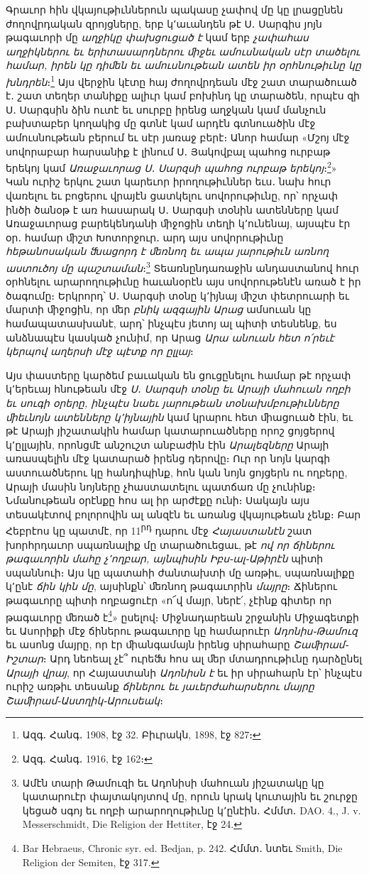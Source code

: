 \documentclass{article}
\begin{document}
{Գրաւոր հին վկայութիւններուն պակասը չափով մը կը լրացընեն ժողովրդական զրոյցները, երբ կ՚աւանդեն թէ Ս․ Սարգիս յոյն թագաւորի մը \emph{աղջիկը փախցուցած է} կամ երբ \emph{չափահաս աղջիկներու եւ երիտասարդներու ﬕջեւ ամուսնական սէր տածելու համար, իրեն կը դիﬔն եւ ամուսնութեան ատեն իր օրհնութիւնը կը խնդրեն}։\footnote{Ազգ․ Հանգ․ 1908, էջ 32. Բիւրակն, 1898, էջ 827։} Այս վերջին կէտը հայ ժողովրդեան մէջ շատ տարածուած է․ շատ տեղեր տանիքը ալիւր կամ բոխինդ կը տարածեն, որպէս զի Ս․ Սարգսին ձին ուտէ եւ սուրբը իրենց աղջկան կամ մանչուն բախտաբեր կողակից մը գտնէ կամ արդէն գտնուածին մէջ ամուսնութեան բերում եւ սէր յառաջ բերէ։ Անոր համար «Մշոյ մէջ սովորաբար հարսանիք է լինում Ս․ Յակովբալ պահոց ուրբաթ երեկոյ կամ \emph{Առաջաւորաց Ս․ Սարզսի պահոց ուրբաթ երեկոյ}։\footnote{Ազգ․ Հանգ․ 1916, էջ 162։}» Կան ուրիշ երկու շատ կարեւոր իրողութիւններ եւս․ նախ հուր վառելու եւ բոցերու վրայէն ցատկելու սովորութիւնը, որ՝ որչափ ինծի ծանօթ է առ հասարակ Ս․ Սարգսի տօնին ատենները կամ Առաջաւորաց բարեկենդանի ﬕջոցին տեղի կ՚ունենայ, այսպէս էր օր․ համար ﬕշտ Խոտորջուր․ արդ այս սովորութիւնը \emph{հեթանոսական ﬓացորդ է ﬔռնող եւ ապա յարութիւն առնող աստուծոյ մը պաշտաման}։\footnote{Ամէն տարի Թամուզի եւ Ադոնիսի մահուան յիշատակը կը կատարուէր փայտակոյտով մը, որուն կրակ կուտային եւ շուրջը կեցած սգոյ եւ ողբի արարողութիւնը կ՚ընէին․ Հմմտ․ DAO. 4., J. v. Messerschmidt, Die Religion der Hettiter, էջ 24.} Տեառնընդառաջին անդաստանով հուր օրհնելու արարողութիւնը հաւանօրէն այս սովորութենէն առած է իր ծագումը։ Երկրորդ՝ Ս․ Սարգսի տօնը կ՚իյնայ ﬕշտ փետրուարի եւ մարտի ﬕջոցին, որ ﬔր \emph{բնիկ ազգային Արաց} ամսուան կը համապատասխանէ, արդ՝ ինչպէս յետոյ ալ պիտի տեսնենք, ես անձնապէս կասկած չունիմ, որ Արաց \emph{Արա անուան հետ ո՛րեւէ կերպով աղերսի մէջ պէտք որ ըլլայ}։

Այս փաստերը կարծեմ բաւական են ցուցընելու համար թէ որչափ կ՚երեւայ հնութեան մէջ \emph{Ս․ Սարգսի տօնը եւ Արայի մահուան ողբի եւ սուգի օրերը, ինչպէս նաեւ յարութեան տօնախմբութիւնները ﬕեւնոյն ատենները կ՚իյնային} կամ կրարու հետ ﬕացուած էին, եւ թէ Արայի յիշատակին համար կատարուածները որոշ ցոյցերով կ՚ըլլային, որոնցմէ անշուշտ անբաժին էին \emph{Արալեզները} Արայի առասպելին մէջ կատարած իրենց դերովը։ Ուր որ նոյն կարգի աստուածներու կը հանդիպինք, հոն կան նոյն ցոյցերն ու ողբերը, Արայի մասին նոյները չհաստատելու պատճառ մը չունինք։ Նմանութեան օրէնքը հոս ալ իր արժէքը ունի։ Սակայն այս տեսակէտով բոլորովին ալ անզէն եւ առանց վկայութեան չենք։ Բար Հեբրէոս կը պատմէ, որ 11\textsuperscript{րդ} դարու մէջ \emph{Հայաստանէն} շատ խորհրդաւոր սպառնալիք մը տարածուեցաւ, թէ \emph{ով որ ճիներու թագաւորին մահը չ՚ողբար, այնպիսին Իբս֊ալ֊Աթիրէն} պիտի սպաննուի։ Այս կը պատահի ժանտախտի մը առթիւ, սպառնալիքը կ՚ընէ \emph{ճին կին մը}, այսինքն՝ ﬔռնող թագաւորին \emph{մայրը}։ Ճիներու թագաւորը պիտի ողբացուէր «ո՜վ մայր, ներէ՛, չէինք գիտեր որ թագաւորը ﬔռած է\footnote{Bar Hebraeus, Chronic syr. ed. Bedjan, p. 242. Հմմտ․ նտեւ Smith, Die Religion der Semiten, էջ 317.}» ըսելով։ Միջնադարեան շրջանին Միջագետքի եւ Ասորիքի մէջ ճիներու թագաւորը կը համարուէր \emph{Ադոնիս֊Թամուզ} եւ ասոնց մայրը, որ էր ﬕանգամայն իրենց սիրահարը \emph{Շաﬕրամ֊Իշտար}։ Արդ նեոեալ չէ՞ ուրեﬓ հոս ալ ﬔր մտադրութիւնը դարձընել \emph{Արայի վրայ}, որ Հայաստանի \emph{Ադոնիսն է} եւ իր սիրահարն էր՝ ինչպէս ուրիշ առթիւ տեսանք \emph{ճիներու եւ յաւերժահարսերու մայրը Շաﬕրամ֊Աստղիկ֊Արուսեակ}։

}
\end{document}
